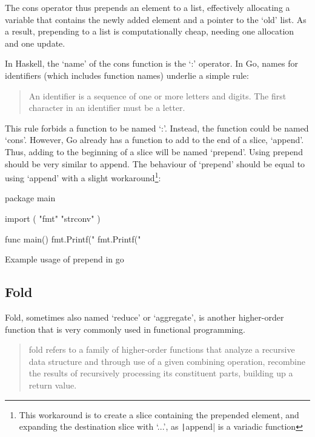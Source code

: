 The cons operator thus prepends an element to a list, effectively allocating a
variable that contains the newly added element and a pointer to the `old' list.
As a result, prepending to a list is computationally cheap, needing one allocation
and one update.

In Haskell, the `name' of the cons function is the `:' operator.
In Go, names for identifiers (which includes function names) underlie a simple
rule:
\begin{quote}
    An identifier is a sequence of one or more letters and digits. The first
    character in an identifier must be a letter.\autocite{spec-identifiers}
\end{quote}

This rule forbids a function to be named `:'. Instead, the function could be
named `cons'. However, Go already has a function to add to the end of a slice,
`append'. Thus, adding to the beginning of a slice will be named `prepend'.
Using prepend should be very similar to append. The behaviour of `prepend'
should be equal to using `append' with a slight workaround\footnote{This workaround
	is to create a slice containing the prepended element, and expanding the
destination slice with `...', as \texttt|append| is a variadic function}:

\begin{listing}
    \begin{gocode}
package main

import (
  "fmt"
  "strconv"
)

func main() {
	fmt.Printf("%
	fmt.Printf("%
}
\end{gocode}
    \caption{Example usage of prepend in go}\label{code:prepend-go}
\end{listing}
\subsection{Fold}\label{sec:fold}

Fold, sometimes also named `reduce' or `aggregate', is another higher-order function
that is very commonly used in functional programming.

\begin{quote}
	fold refers to a family of higher-order functions that
	analyze a recursive data structure and through use of a given
	combining operation, recombine the results of recursively processing its
	constituent parts, building up a return value.\autocite{fold-wiki}
\end{quote}

